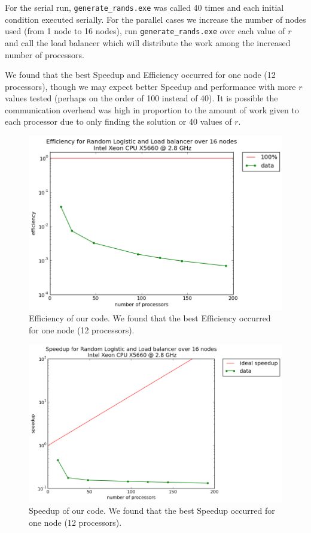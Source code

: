 \documentclass[12pt]{article}
\begin{document}
For the serial run,
  \texttt{generate\_rands.exe} was called 40 times and each initial
  condition executed serially. For the parallel cases we increase the number of nodes used (from 1 node to 16 nodes), run
\texttt{generate\_rands.exe} over each value of $r$ and call the load
balancer which will distribute the work among the increased number of
processors.

We found that the best Speedup and Efficiency occurred for one node
(12 processors), though we may expect better Speedup and performance
with more $r$ values tested (perhaps on the order of 100 instead of 40). It is possible the communication overhead was high in proportion to the amount of work given to each processor due to only finding the solution or 40 values of $r$.
\begin{figure}[H]
	\begin{center}
		\includegraphics[scale=0.5]{efficiency_random_logistic}
\caption{Efficiency of our code. We found that the best Efficiency occurred for one node
(12 processors).}
	\end{center}
\end{figure}
\begin{figure}[H]
	\begin{center}
		\includegraphics[scale=0.5]{speedup_random_logistic}
\caption{Speedup of our code. We found that the best Speedup occurred for one node
(12 processors).}\label{speedup}
	\end{center}
\end{figure}
\end{document}
